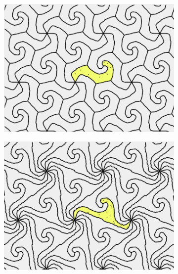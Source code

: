 \documentclass[12pt]{report}
\begin{document}
\begin{figure}[H]
\begin{subfigure}[b]{0.33\textwidth}
  \end{subfigure}

\quad

  \begin{subfigure}[b]{0.33\textwidth}
    \includegraphics[width=.9\textwidth]{sl3.png}

  \end{subfigure}
  \begin{subfigure}[b]{0.33\textwidth}
    \includegraphics[width=.9\textwidth]{sl4.png}


\end{subfigure}
\end{figure}
\end{document}
